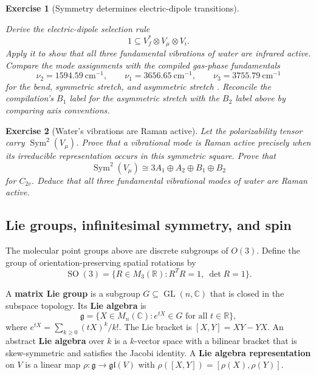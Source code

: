 \documentclass{article}
\newtheorem{exercise}{Exercise}
\begin{document}
\begin{exercise}[Symmetry determines electric-dipole transitions]
\label{ex:electric-dipole-selection}\leavevmode\par
\textit{Derive the electric-dipole selection rule}
\[
1\subseteq V_f^*\otimes V_\mu\otimes V_i.
\]
\textit{Apply it to show that all three fundamental vibrations of water are
infrared active. Compare the mode assignments with the compiled gas-phase
fundamentals}
\[
\nu_2=1594.59\ \mathrm{cm}^{-1},
\qquad
\nu_1=3656.65\ \mathrm{cm}^{-1},
\qquad
\nu_3=3755.79\ \mathrm{cm}^{-1}
\]
\textit{for the bend, symmetric stretch, and asymmetric stretch
\cite{shimanouchi-water}. Reconcile the compilation's $B_1$ label for the
asymmetric stretch with the $B_2$ label above by comparing axis conventions.}
\end{exercise}

\begin{exercise}[Water's vibrations are Raman active]\leavevmode\par
\textit{Let the polarizability tensor carry $\operatorname{Sym}^2(V_\mu)$. Prove that a vibrational mode is Raman active precisely when its irreducible representation occurs in this symmetric square. Prove that}
\[
\operatorname{Sym}^2(V_\mu)
\cong3A_1\oplus A_2\oplus B_1\oplus B_2
\]
\textit{for $C_{2v}$. Deduce that all three fundamental vibrational modes of water are Raman active.}
\end{exercise}

\subsection{Lie groups, infinitesimal symmetry, and spin}

The molecular point groups above are discrete subgroups of $O(3)$. Define the
group of orientation-preserving spatial rotations by
\[
\operatorname{SO}(3)
=\{R\in M_3(\mathbb R):R^TR=1,\ \det R=1\}.
\]

A \textbf{matrix Lie group} is a subgroup $G\subseteq\operatorname{GL}(n,\mathbb C)$ that is closed in the subspace topology. Its \textbf{Lie algebra} is
\[
\mathfrak g=\{X\in M_n(\mathbb C):e^{tX}\in G\text{ for all }t\in\mathbb R\},
\]
where $e^{tX}=\sum_{k\geq0}(tX)^k/k!$. The Lie bracket is $[X,Y]=XY-YX$. An abstract \textbf{Lie algebra} over $k$ is a $k$-vector space with a bilinear bracket that is skew-symmetric and satisfies the Jacobi identity. A \textbf{Lie algebra representation} on $V$ is a linear map $\rho:\mathfrak g\to\mathfrak{gl}(V)$ with $\rho([X,Y])=[\rho(X),\rho(Y)]$.
\end{document}
